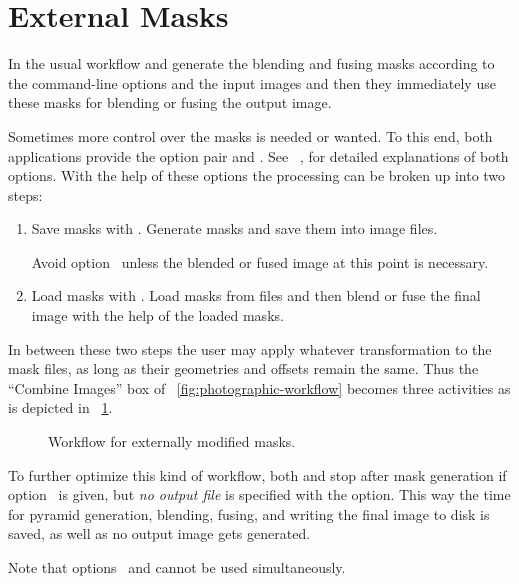 

\section[External Masks]{\label{sec:external-masks}%
  External Masks}

In the usual workflow  and  generate the blending and
fusing masks according to the command-line options and the input images and then they
immediately use these masks for blending or fusing the output image.

Sometimes more control over the masks is needed or wanted.  To this end, both applications
provide the option pair  and .  See
\chapterName~, for detailed explanations of both options.  With the help
of these options the processing can be broken up into two steps:

\begin{enumerate}
\item
  Save masks with .  Generate masks and save them into image files.

  Avoid option~ unless the blended or fused image at this point is necessary.

\item
  Load masks with .  Load masks from files and then blend or fuse the final
  image with the help of the loaded masks.
\end{enumerate}

In between these two steps the user may apply whatever transformation to the mask files, as long
as their geometries and offsets remain the same.  Thus the ``Combine Images'' box of
\figureName~\ref{fig:photographic-workflow} becomes three activities as is depicted in
\figureName~\ref{fig:external-mask-workflow}.

\begin{figure}[htbp]
  \begin{maxipage}
    \centering
  \end{maxipage}

  \caption[External mask workflow]{\label{fig:external-mask-workflow}%
    Workflow for externally modified masks.}
\end{figure}

To further optimize this kind of workflow, both  and 
stop after mask generation if option~ is given, but \emph{no output file}
is specified with the  option.  This way the time for pyramid generation,
blending, fusing, and writing the final image to disk is saved, as well as no output image gets
generated.

Note that options~ and  cannot be used simultaneously.


